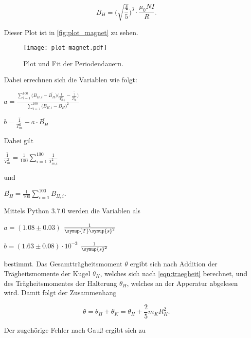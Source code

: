 \begin{equation}
    B_H = \bigg( \sqrt{\frac{4}{5}} \bigg)^3 \cdot \frac{\mu_0 N I}{R}.
\end{equation}

Dieser Plot ist in \autoref{fig:plot_magnet} zu sehen.

\begin{figure}
  \centering
  \texttt{[image: plot-magnet.pdf]}
  \caption{Plot und Fit der Periodendauern.}
  \label{fig:plot_magnet}
\end{figure}

Dabei errechnen sich die Variablen wie folgt:

\vspace{.5em}
\centerline{$a = \frac{\sum_{i=1}^{100} \Big(B_{H,i} - \overline{B_H}\Big) \Big(\frac{1}{T_m^2}_i - \overline{\frac{1}{T_m^2}}\Big)}{\sum_{i=1}^{100} \Big(B_{H,i} - \overline{B_H}\Big)^2}$}
\vspace{1em}
\centerline{$b = \overline{\frac{1}{T_m^2}} - a \cdot \overline{B_H}$}
\vspace{.5em}

Dabei gilt

\vspace{.5em}
\centerline{$\overline{\frac{1}{T_m^2}} = \frac{1}{100} \sum_{i=1}^{100} \frac{1}{T_{m,i}^2}$}

und

\centerline{$\overline{B_H} = \frac{1}{100} \sum_{i=1}^{100} B_{H,i}$.}
\vspace{.5em}

Mittels Python 3.7.0 werden die Variablen als

\vspace{.5em}
\centerline{$a = (1.08 \pm 0.03)$ $\frac{1}{\symup{T} \symup{s}^2}$}

\centerline{$b = (1.63 \pm 0.08) \cdot 10^{-3}$ $\frac{1}{\symup{s}^2}$}
\vspace{.5em}

bestimmt. Das Gesamtträgheitsmoment $\theta$ ergibt sich nach Addition der Trägheitsmomente der Kugel $\theta_K$, welches sich nach \eqref{eqn:traegheit} berechnet, und des Trägheitsmomentes der Halterung $\theta_H$, welches an der Apperatur abgelesen wird.
Damit folgt der Zusammenhang

\begin{equation}
  \theta = \theta_H + \theta_K = \theta_H + \frac {2}{5} m_K R_K^{2}.
\end{equation}

Der zugehörige Fehler nach Gauß ergibt sich zu

